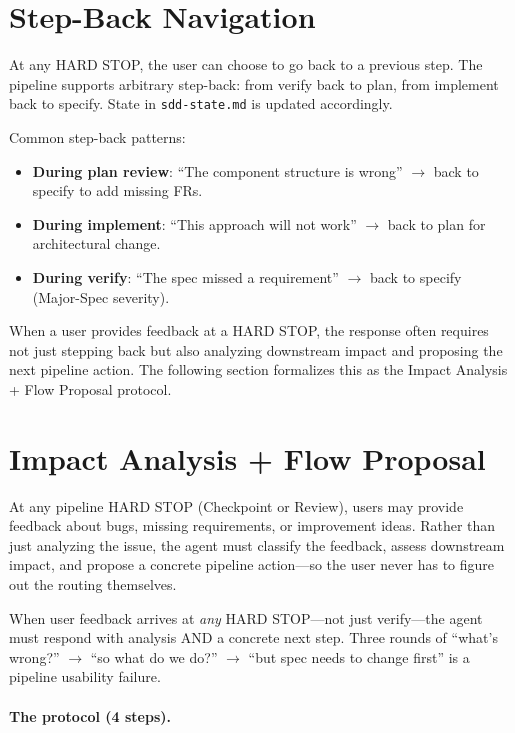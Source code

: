 \documentclass[11pt,a4paper,openright,twoside]{report}
\newcommand{\file}[1]{\texttt{#1}}
\begin{document}
\section{Step-Back Navigation}

At any HARD STOP, the user can choose to go back to a previous step. The pipeline supports arbitrary step-back: from verify back to plan, from implement back to specify. State in \file{sdd-state.md} is updated accordingly.

Common step-back patterns:

\begin{itemize}
  \item \textbf{During plan review}: ``The component structure is wrong'' $\rightarrow$ back to specify to add missing FRs.
  \item \textbf{During implement}: ``This approach will not work'' $\rightarrow$ back to plan for architectural change.
  \item \textbf{During verify}: ``The spec missed a requirement'' $\rightarrow$ back to specify (Major-Spec severity).
\end{itemize}

When a user provides feedback at a HARD STOP, the response often requires not just stepping back but also analyzing downstream impact and proposing the next pipeline action. The following section formalizes this as the Impact Analysis + Flow Proposal protocol.

\section{Impact Analysis + Flow Proposal}

At any pipeline HARD STOP (Checkpoint or Review), users may provide feedback about bugs, missing requirements, or improvement ideas. Rather than just analyzing the issue, the agent must classify the feedback, assess downstream impact, and propose a concrete pipeline action---so the user never has to figure out the routing themselves.

When user feedback arrives at \emph{any} HARD STOP---not just verify---the agent must respond with analysis AND a concrete next step. Three rounds of ``what's wrong?'' $\rightarrow$ ``so what do we do?'' $\rightarrow$ ``but spec needs to change first'' is a pipeline usability failure.

\paragraph{The protocol (4 steps).}
\end{document}
